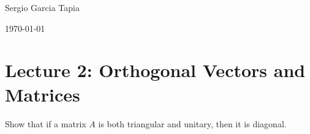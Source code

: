 \documentclass[12pt]{article}
\newenvironment{ex}[2][Exercise]{\begin{trivlist}
		\item[\hskip \labelsep {\bfseries #1}\hskip \labelsep {\bfseries #2.}]}{\end{trivlist}}
\begin{document}

\noindent Sergio Garcia Tapia \hfill

 \hfill 

 \hfill 

\noindent\today
\section*{Lecture 2: Orthogonal Vectors and Matrices}

\begin{ex}{1}
	Show that if a matrix $A$ is both triangular and unitary, then it is diagonal.
\end{ex}
\end{document}
